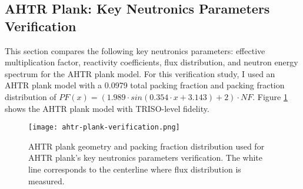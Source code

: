 \subsection{AHTR Plank: Key Neutronics Parameters Verification}
\label{sec:plank-knp}
This section compares the following key neutronics parameters: effective 
multiplication factor, reactivity coefficients, flux distribution, and neutron energy 
spectrum for the \gls{AHTR} plank model. 
For this verification study, I used an AHTR plank model with a 0.0979 total packing 
fraction and packing fraction distribution of 
$PF(x) = \left(1.989\cdot sin(0.354\cdot x + 3.143) + 2\right) \cdot NF$. 
Figure \ref{fig:ahtr-plank-verification} shows the AHTR plank model with TRISO-level 
fidelity.
 \begin{figure}[htbp]
    \centering
    \texttt{[image: ahtr-plank-verification.png]}
    \raggedright
    \caption{\acrfull{AHTR} plank geometry and packing fraction distribution used for 
    \gls{AHTR} plank's key neutronics parameters verification. 
    The white line corresponds to the centerline where flux distribution is measured. }  
    \label{fig:ahtr-plank-verification}
\end{figure}

